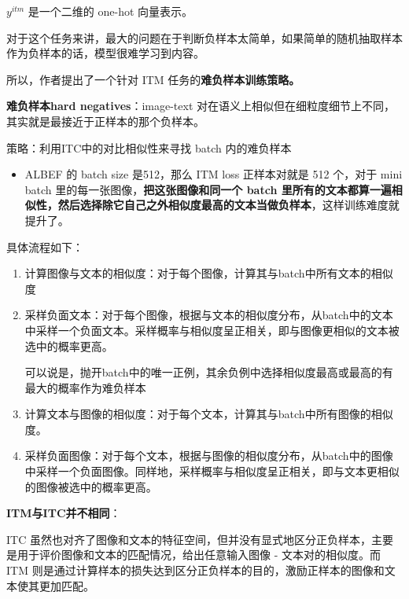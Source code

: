 \documentclass[zihao=false,fontset=windows]{ctexart}
\begin{document}
$y^{itm}$ 是一个二维的 one-hot 向量表示。\par
对于这个任务来讲，最大的问题在于判断负样本太简单，如果简单的随机抽取样本作为负样本的话，模型很难学习到内容。\par
所以，作者提出了一个针对 ITM 任务的\textcolor{feishuRed}{\textbf{难负样本训练策略。}}\par
\begin{feishuquote}
\textbf{难负样本hard negatives}：image-text 对在语义上相似但在细粒度细节上不同，其实就是最接近于正样本的那个负样本。\par
\end{feishuquote}
策略：利用ITC中的对比相似性来寻找 batch 内的难负样本\par
\begin{itemize}
\item ALBEF 的 batch size 是512，那么 ITM loss 正样本对就是 512 个，对于 mini batch 里的每一张图像，\textbf{把这张图像和同一个 batch 里所有的文本都算一遍相似性，然后选择除它自己之外相似度最高的文本当做负样本}，这样训练难度就提升了。
\end{itemize}
具体流程如下：\par
\begin{enumerate}
\item 计算图像与文本的相似度：对于每个图像，计算其与batch中所有文本的相似度
\item 采样负面文本：对于每个图像，根据与文本的相似度分布，从batch中的文本中采样一个负面文本。采样概率与相似度呈正相关，即与图像更相似的文本被选中的概率更高。
\begin{feishuquote}
可以说是，抛开batch中的唯一正例，其余负例中选择相似度最高或最高的有最大的概率作为难负样本\par
\end{feishuquote}
\item 计算文本与图像的相似度：对于每个文本，计算其与batch中所有图像的相似度。
\item 采样负面图像：对于每个文本，根据与图像的相似度分布，从batch中的图像中采样一个负面图像。同样地，采样概率与相似度呈正相关，即与文本更相似的图像被选中的概率更高。
\end{enumerate}
\begin{feishuquote}
\textbf{ITM与ITC并不相同}：\par
ITC 虽然也对齐了图像和文本的特征空间，但并没有显式地区分正负样本，主要是用于评价图像和文本的匹配情况，给出任意输入图像 - 文本对的相似度。而 ITM 则是通过计算样本的损失达到区分正负样本的目的，激励正样本的图像和文本使其更加匹配。\par
\end{feishuquote}
\end{document}
